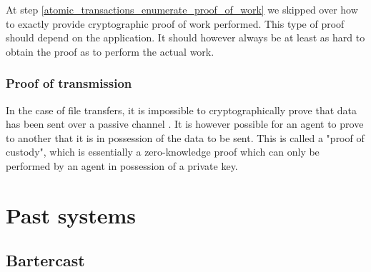 At step \ref{atomic_transactions_enumerate_proof_of_work} we skipped over how to exactly provide cryptographic proof of work performed. This type of proof should depend on the application. It should however always be at least as hard to obtain the proof as to perform the actual work.

\subsubsection{Proof of transmission}\label{sssection:proof_of_transmission}
In the case of file transfers, it is impossible to cryptographically prove that data has been sent over a passive channel \cite{kravchenko}. It is however possible for an agent to prove to another that it is in possession of the data to be sent. This is called a "proof of custody", which is essentially a zero-knowledge proof which can only be performed by an agent in possession of a private key.

\section{Past systems}
\subsection{Bartercast}



